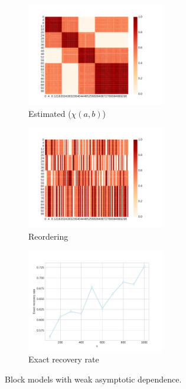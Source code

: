 \documentclass[11pt]{article}
\theoremstyle{definition}
\begin{document}
	\begin{figure}[!htp]
    \label{fig:chiab}
                \begin{subfigure}{.33\textwidth}
                  \centering
                  \includegraphics[width=.9\linewidth,height=4.5cm]{figure/chiab.pdf}
                  \caption{Estimated ($\chi(a,b)$)}
                  \label{fig:sfig_chiab}
                \end{subfigure}%
                \begin{subfigure}{.33\textwidth}
                  \centering
                  \includegraphics[width=.9\linewidth,height=4.5cm]{figure/chiab_sampled.pdf}
                  \caption{Reordering}
                  \label{fig:sfig_chiab_sampled}
                \end{subfigure}
                \begin{subfigure}{.33\textwidth}
                  \centering
                  \includegraphics[width=.9\linewidth,height=4.5cm]{figure/exact_recov_rate_model_4.pdf}
                  \caption{Exact recovery rate}
                  \label{fig:sfig_results_model_4}
                \end{subfigure}
    	\caption{Block models with weak asymptotic dependence.}
	\end{figure}
	
\end{document}
